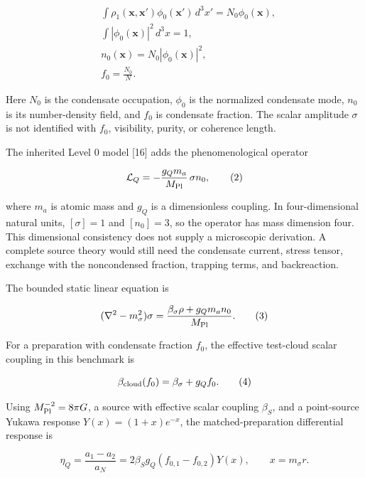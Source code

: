 \documentclass[
  american,
  11pt,
  letterpaper,
]{article}
\begin{document}
\begin{equation}
\begin{aligned}
& \int \rho_1(\mathbf x,\mathbf x')\phi_0(\mathbf x')\,d^3x'
=N_0\phi_0(\mathbf x), \\
& \int |\phi_0(\mathbf x)|^2\,d^3x=1, \\
& n_0(\mathbf x)=N_0|\phi_0(\mathbf x)|^2, \\
& f_0=\frac{N_0}{N}.
\end{aligned}
\tag{1}
\end{equation}

Here \(N_0\) is the condensate occupation, \(\phi_0\) is the normalized condensate mode, \(n_0\) is its number-density field, and \(f_0\) is condensate fraction. The scalar amplitude \(\sigma\) is not identified with \(f_0\), visibility, purity, or coherence length.

The inherited Level 0 model {[}16{]} adds the phenomenological operator

\begin{equation}
\mathcal L_Q=-\frac{g_Qm_a}{M_{\rm Pl}}\,\sigma n_0 ,
\tag{2}
\end{equation}

where \(m_a\) is atomic mass and \(g_Q\) is a dimensionless coupling. In four-dimensional natural units, \([\sigma]=1\) and \([n_0]=3\), so the operator has mass dimension four. This dimensional consistency does not supply a microscopic derivation. A complete source theory would still need the condensate current, stress tensor, exchange with the noncondensed fraction, trapping terms, and backreaction.

The bounded static linear equation is

\begin{equation}
(\nabla^2-m_\sigma^2)\sigma
=\frac{\beta_\sigma\rho+g_Qm_an_0}{M_{\rm Pl}} .
\tag{3}
\end{equation}

For a preparation with condensate fraction \(f_0\), the effective test-cloud scalar coupling in this benchmark is

\begin{equation}
\beta_{\rm cloud}(f_0)=\beta_\sigma+g_Qf_0 .
\tag{4}
\end{equation}

Using \(M_{\rm Pl}^{-2}=8\pi G\), a source with effective scalar coupling \(\beta_S\), and a point-source Yukawa response \(Y(x)=(1+x)e^{-x}\), the matched-preparation differential response is

\begin{equation}
\eta_Q
=\frac{a_1-a_2}{a_N}
=2\beta_Sg_Q(f_{0,1}-f_{0,2})Y(x),
\qquad x=m_\sigma r .
\tag{5}
\end{equation}
\end{document}
